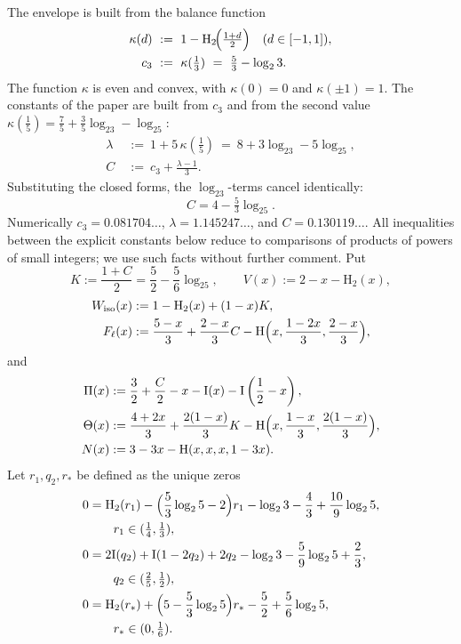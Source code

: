 \documentclass[journal]{IEEEtran}
\theoremstyle{definition}
\newcommand{\Hh}{\mathrm H_2}
\newcommand{\kp}{\kappa}
\newcommand{\lgg}{\log_2}
\newcommand{\CC}{C}
\newcommand{\lam}{\lambda}
\newcommand{\cthree}{c_3}
\begin{document}
The envelope is built from the balance function
\[
\begin{aligned}
  \kp(d)&\ :=\ 1-\Hh\!\Bigl(\tfrac{1+d}{2}\Bigr)\quad(d\in[-1,1]),\\
  \cthree&\ :=\ \kp(\tfrac13)\ =\ \tfrac53-\lgg3 .
\end{aligned}
\]
The function $\kp$ is even and convex, with $\kp(0)=0$ and $\kp(\pm1)=1$. The
constants of the paper are built from $\cthree$ and from the second value
$\kp(\tfrac15)=\tfrac75+\tfrac35\lgg3-\lgg5$:
\begin{equation}\label{eq:constants}
\begin{aligned}
  \lam&\ :=\ 1+5\,\kp(\tfrac15)\ =\ 8+3\lgg3-5\lgg5,\\
  \CC&\ :=\ \cthree+\frac{\lam-1}{3} .
\end{aligned}
\end{equation}
Substituting the closed forms, the $\lgg3$-terms cancel identically:
\begin{equation}\label{eq:cancel}
  \CC=4-\tfrac53\lgg5 .
\end{equation}
Numerically $\cthree=0.081704\ldots$, $\lam=1.145247\ldots$, and
$\CC=0.130119\ldots$. All inequalities between the explicit constants below
reduce to comparisons of products of powers of small integers; we use such facts
without further comment. Put
\[
  K:=\frac{1+\CC}{2}=\frac52-\frac56\lgg5,\qquad
  V(x):=2-x-\Hh(x),
\]
\[
\begin{aligned}
  W_{\mathrm{iso}}(x)&:=1-\Hh(x)+(1-x)K,\\
  F_\ell(x)&:=\frac{5-x}{3}+\frac{2-x}{3}\CC
  -\mathrm H\Bigl(x,\frac{1-2x}{3},\frac{2-x}{3}\Bigr),
\end{aligned}
\]
and
\[
\begin{aligned}
  \Pi(x)&:=\frac32+\frac{\CC}{2}-x-\mathrm I(x)-\mathrm I\left(\frac12-x\right),\\
  \Theta(x)&:=\frac{4+2x}{3}+\frac{2(1-x)}{3}K
   -\mathrm H\Bigl(x,\frac{1-x}{3},\frac{2(1-x)}{3}\Bigr),\\
  N(x)&:=3-3x-\mathrm H(x,x,x,1-3x).
\end{aligned}
\]
Let $r_1,q_2,r_*$ be defined as the unique zeros
\[
  \begin{aligned}
  0&=\Hh(r_1)-\Bigl(\frac53\lgg5-2\Bigr)r_1
      -\lgg3-\frac43+\frac{10}{9}\lgg5,\\
   &\qquad r_1\in(\tfrac14,\tfrac13),\\
  0&=2\mathrm I(q_2)+\mathrm I(1-2q_2)+2q_2-\lgg3-\frac59\lgg5+\frac23,\\
   &\qquad q_2\in(\tfrac25,\tfrac12),\\
  0&=\Hh(r_*)+\Bigl(5-\frac53\lgg5\Bigr)r_*-\frac52+\frac56\lgg5,\\
   &\qquad r_*\in(0,\tfrac16).
  \end{aligned}
\]
\end{document}
